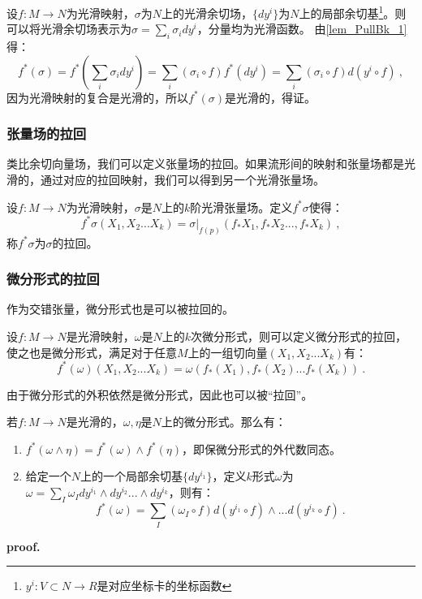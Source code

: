 设$f:M\rightarrow N$为光滑映射，$\sigma$为$N$上的光滑余切场，$\{dy^i\}$为$N$上的局部余切基\footnote{$y^i:V\subset N\rightarrow R$是对应坐标卡的坐标函数}。则可以将光滑余切场表示为$\sigma=\sum_i\sigma_idy^i $，分量均为光滑函数。
由\autoref{lem_PullBk_1} 得：
\begin{equation}
f^*(\sigma)=f^*(\sum_i\sigma_idy^i)=\sum_i(\sigma_i\circ f)f^*(dy^i)=\sum_i(\sigma_i\circ f)d(y^i\circ f)~,
\end{equation}
因为光滑映射的复合是光滑的，所以$f^*(\sigma)$是光滑的，得证。
\subsubsection{张量场的拉回}
类比余切向量场，我们可以定义张量场的拉回。如果流形间的映射和张量场都是光滑的，通过对应的拉回映射，我们可以得到另一个光滑张量场。
\begin{definition}{}
设$f:M\rightarrow N$为光滑映射，$\sigma$是$N$上的$k$阶光滑张量场。定义$f^*\sigma$使得：
\begin{equation}
f^*\sigma(X_1,X_2...X_k)=\sigma|_{f(p)}(f_*X_1,f_*X_2...,f_*X_k)~,
\end{equation}
称$f^*\sigma$为$\sigma$的拉回。
\end{definition}

\subsubsection{微分形式的拉回}
作为交错张量，微分形式也是可以被拉回的。
\begin{definition}{}
设$f:M\rightarrow N$是光滑映射，$\omega$是$N$上的$k$次微分形式，则可以定义微分形式的拉回，使之也是微分形式，满足对于任意$M$上的一组切向量$(X_1,X_2...X_k)$有：
\begin{equation}
f^*(\omega)(X_1,X_2...X_k)=\omega(f_*(X_1),f_*(X_2)...f_*(X_k))~.
\end{equation}
\end{definition}
由于微分形式的外积依然是微分形式，因此也可以被“拉回”。
\begin{theorem}{}\label{the_PullBk_1}
若$f:M\rightarrow N$是光滑的，$\omega,\eta$是$N$上的微分形式。那么有：
\begin{enumerate}
\item $f^*(\omega\wedge \eta)=f^*(\omega)\wedge f^*(\eta)$，即保微分形式的外代数同态。
\item 给定一个$N$上的一个局部余切基$\{dy^{i_1}\}$，定义$k$形式$\omega$为$\omega=\sum_I\omega_I dy^{i_1}\wedge dy^{i_2}...\wedge dy^{i_k}$，则有：
\begin{equation}
f^*(\omega)=\sum_I (\omega_I\circ f)d(y^{i_1}\circ f)\wedge...d(y^{i_k}\circ f)~.
\end{equation}
\end{enumerate}
\end{theorem}
\textbf{proof.}

